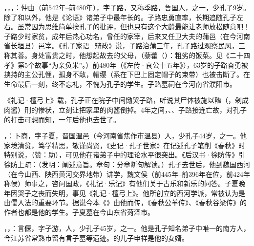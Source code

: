，，，：仲由（前542年--前480年），字子路，又称季路，鲁国人，之一，少孔子9岁。除了和以外，他是《论语》诸弟子中最年长的。子路忠勇直率，长期追随孔子左右。虽常因为思维简单挨孔子的批评，但也只有这个大龄最能让老师放松随意吧！子路少时家贫，成年后热心功名，曾任的家宰，后来又任卫大夫的蒲邑（在今河南省长垣县）邑宰。《孔子家语·辩政》说，子路治蒲三年，孔子路过观察民风，三称其善。身处富贵之时，他想起故去的父母，（藜藿（）：粗劣的饭菜。见《二十四孝》第5个故事“为亲负米”。）前480年（《左传·哀公十五年》），63岁的子路奋勇被挟持的主公孔悝，孤身不敌，帽缨（系在下巴上固定帽子的束带）也被击断了。在生命最后一刻，终不忘礼，不愧为孔子的学生。子路墓祠在今河南省濮阳市。

《礼记·檀弓上》载，孔子正在院子中间恸哭子路，听说其尸体被施以醢（，剁成肉酱）刑的惨状，立刻让把家里的肉酱倒掉。4年之间，、、子路接连亡故，对孔子的打击可想而知，一年后他也去世了。

，：卜商，字子夏，晋国温邑（今河南省焦作市温县）人，少孔子44岁，之一。他家境清贫，笃学精思，敬谨尚贤，《史记·孔子世家》在记述孔子笔削《春秋》时特别说，（赞：助），可见他在诸弟子中的理论水平很突出。《后汉书·徐防传》引徐防上疏：（发明：阐述意旨。章句：分章断句解读。）孔子去世后，他到魏国西河（在今山西、陕西黄河交界地带）讲学，魏文侯（前445年--前396年在位，前424年称侯）师事之，咨问国政，《礼记·乐记》有他们关于古乐和新乐的问答。子夏晚年因哭子之丧而失明，事见《礼记·檀弓上》。他所创立的西河学派，常被认为是由儒入法的重要环节。据说今本《》由他而传，《春秋公羊传》、《春秋谷梁传》的作者也都是他的学生。子夏墓在今山东省菏泽市。

，，：言偃，字子游，人，少孔子45岁，之一。他是孔子知名弟子中唯一的南方人，今江苏省常熟市留有言子墓等遗迹。的儿子申祥是他的女婿。

